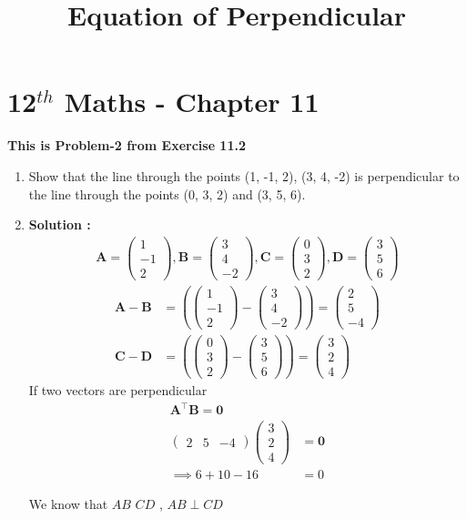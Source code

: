 \documentclass[12pt]{article}
\providecommand{\brak}[1]{\ensuremath{\left(#1\right)}}
\newcommand{\myvec}[1]{\ensuremath{\begin{pmatrix}#1\end{pmatrix}}}
\let\vec\mathbf
\begin{document}
\begin{center}
\title{\textbf{Equation  of Perpendicular}}
\date{\vspace{-5ex}} %
\maketitle
\end{center}
\setcounter{page}{1}
\section{12$^{th}$ Maths - Chapter 11}
\textbf{This is Problem-2 from Exercise 11.2}
\begin{enumerate}
\item Show that the line through the points (1, -1, 2), (3, 4, -2) is perpendicular to the line through the points (0, 3, 2) and (3, 5, 6).
\item \textbf{Solution :}
\begin{align}  
\vec{A}=\myvec{1 \\-1\\2},
\vec{B}=\myvec{3 \\ 4\\-2},
\vec{C}=\myvec{0 \\ 3\\2},
\vec{D}=\myvec{3 \\ 5\\6}
\end{align}
\begin{align}
\vec{A}-\vec{B} &= \brak{\myvec{1 \\-1\\ 2 } - \myvec{3 \\4\\-2 } } = \myvec{2 \\ 5\\-4 }\\
\vec{C}-\vec{D} &= \brak{\myvec{0 \\ 3\\2 } - \myvec{3 \\5\\6} } = \myvec{3\\2\\4}
\end{align}
 If two vectors are perpendicular
\begin{align}
\vec{A}^\top\vec{B}=\vec{0}\\
 \myvec{2 & 5& -4}\myvec{3 \\2\\4 } &= \vec{0}\\
 \implies 6+10-16&=0
\end{align}

We know that $AB$  $CD$ , $AB\perp CD$ 


\end{enumerate} 
\end{document}
